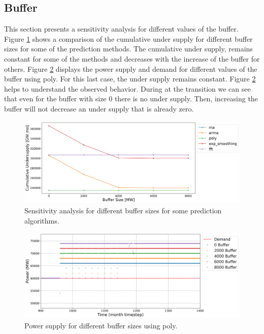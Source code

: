 \documentclass[11pt]{article}
\begin{document}
\subsection{Buffer}

This section presents a sensitivity analysis for different values of the buffer. Figure \ref{fig:23-buff} shows a comparison of the cumulative under supply for different buffer sizes for some of the prediction methods. The cumulative under supply, remains constant for some of the methods and decreases with the increase of the buffer for others. Figure \ref{fig:23-buf-poly} displays the power supply and demand for different values of the buffer using poly. For this last case, the under supply remains constant. Figure \ref{fig:23-buf-poly} helps to understand the observed behavior. During at the transition we can see that even for the buffer with size 0 there is no under supply. Then, increasing the buffer will not decrease an under supply that is already zero.

\begin{figure}[H]
	\centering
	\includegraphics[width=\textwidth]{23-figures/23-sens-buffer.png} 
	\hfill
	\caption{Sensitivity analysis for different buffer sizes for some prediction algorithms.}
	\label{fig:23-buff}
\end{figure}

\begin{figure}[H]
	\centering
	\includegraphics[width=\textwidth]{23-figures/23-power-buffer-poly.png} 
	\hfill
	\caption{Power supply for different buffer sizes using poly.}
	\label{fig:23-buf-poly}
\end{figure}
\end{document}
